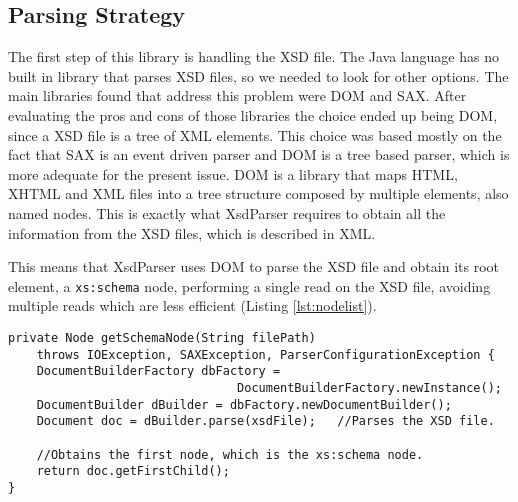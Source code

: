 \subsection{Parsing Strategy}
\label{sec:parsingstrategy}

The first step of this library is handling the \ac{XSD} file. The Java language has no built in library that parses \ac{XSD} files, so we needed to look for other options. The main libraries found that address this problem were \ac{DOM} and \ac{SAX}. After evaluating the pros and cons of those libraries the choice ended up being \ac{DOM}, since a \ac{XSD} file is a tree of \ac{XML} elements. This choice was based mostly on the fact that \ac{SAX} is an event driven parser and \ac{DOM} is a tree based parser, which is more adequate for the present issue. \ac{DOM} is a library that maps \ac{HTML}, \ac{XHTML} and \ac{XML} files into a tree structure composed by multiple elements, also named nodes. This is exactly what XsdParser requires to obtain all the information from the \ac{XSD} files, which is described in \ac{XML}. 

\noindent
This means that XsdParser uses \ac{DOM} to parse the \ac{XSD} file and obtain its root element, a \texttt{xs:schema} node, performing a single read on the \ac{XSD} file, avoiding multiple reads which are less efficient (Listing \ref{lst:nodelist}). 

\bigskip


\begin{minipage}{\linewidth}
\begin{lstlisting}[caption={DOM Document Parsing}, label={lst:nodelist}]
private Node getSchemaNode(String filePath) 
    throws IOException, SAXException, ParserConfigurationException {
    DocumentBuilderFactory dbFactory =                                                              
                                DocumentBuilderFactory.newInstance();
    DocumentBuilder dBuilder = dbFactory.newDocumentBuilder();
    Document doc = dBuilder.parse(xsdFile);   //Parses the XSD file.

    //Obtains the first node, which is the xs:schema node.
    return doc.getFirstChild();
}
\end{lstlisting}
\end{minipage}


